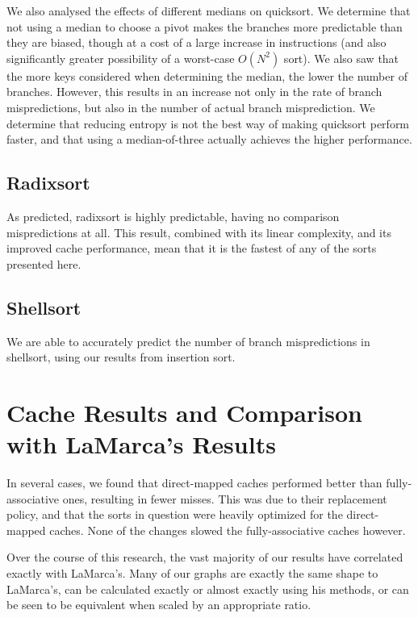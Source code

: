 We also analysed the effects of different medians on quicksort. We determine that
not using a median to choose a pivot makes the branches more predictable than
they are biased, though at a cost of a large increase in instructions (and also
significantly greater possibility of a worst-case $O(N^2)$ sort). We also saw
that the more keys considered when determining the median, the lower the number
of branches. However, this results in an increase not only in the rate of branch
mispredictions, but also in the number of actual branch misprediction. We
determine that reducing entropy is not the best way of making quicksort perform
faster, and that using a median-of-three actually achieves the higher
performance.


\subsection{Radixsort}

As predicted, radixsort is highly predictable, having no comparison
mispredictions at all. This result, combined with its linear complexity, and its
improved cache performance, mean that it is the fastest of any of the sorts
presented here.


\subsection{Shellsort}

We are able to accurately predict the number of branch mispredictions in
shellsort, using our results from insertion sort. 

\section{Cache Results and Comparison with LaMarca's Results}

In several cases, we found that direct-mapped caches performed better than
fully-associative ones, resulting in fewer misses. This was due to their
replacement policy, and that the sorts in question were heavily optimized for
the direct-mapped caches. None of the changes slowed the fully-associative
caches however.

Over the course of this research, the vast majority of our results have
correlated exactly with LaMarca's. Many of our graphs are exactly the same
shape to LaMarca's, can be calculated exactly or almost exactly using his
methods, or can be seen to be equivalent when scaled by an appropriate ratio.


